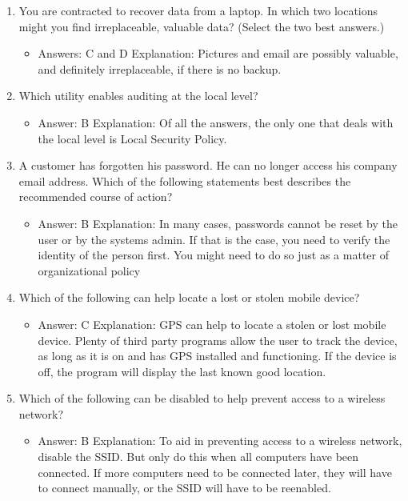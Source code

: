 \documentclass{article}
\begin{document}
\begin{enumerate}
\begin{itemize}
    \end{itemize}
    \item You are contracted to recover data from a laptop. In which two
locations might you find irreplaceable, valuable data? (Select the
two best answers.)
    \begin{itemize}
        \item Answers: C and D
Explanation: Pictures and email are possibly valuable, and definitely irreplaceable, if
there is no backup.
    \end{itemize}
    \item Which utility enables auditing at the local level?
    \begin{itemize}
        \item Answer: B
Explanation: Of all the answers, the only one that deals with the local level is Local
Security Policy.
    \end{itemize}
    \item A customer has forgotten his password. He can no longer access
his company email address. Which of the following statements
best describes the recommended course of action?
    \begin{itemize}
        \item Answer: B
Explanation: In many cases, passwords cannot be reset by the user or by the systems
admin. If that is the case, you need to verify the identity of the person first. You might
need to do so just as a matter of organizational policy
    \end{itemize}
    \item Which of the following can help locate a lost or stolen mobile
device?
    \begin{itemize}
        \item Answer: C
Explanation: GPS can help to locate a stolen or lost mobile device. Plenty of third party
programs allow the user to track the device, as long as it is on and has GPS
installed and functioning. If the device is off, the program will display the last known
good location.
    \end{itemize}
    \item Which of the following can be disabled to help prevent access to a
wireless network?
    \begin{itemize}
        \item Answer: B
Explanation: To aid in preventing access to a wireless network, disable the SSID. But
only do this when all computers have been connected. If more computers need to be
connected later, they will have to connect manually, or the SSID will have to be reenabled.

\end{itemize}
\end{enumerate}
\end{document}
